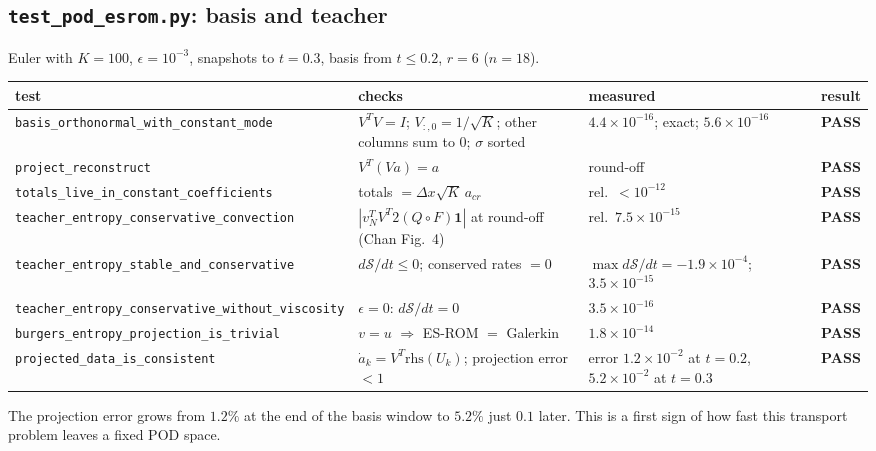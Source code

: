 \documentclass[11pt,a4paper]{article}
\newcommand{\code}[1]{\texttt{\small #1}}
\newcommand{\pass}{\textcolor{green!45!black}{\textbf{PASS}}}
\newcommand{\Sc}{\mathcal S}
\begin{document}
\subsection{\code{test\_pod\_esrom.py}: basis and teacher}
Euler with $K=100$, $\epsilon=10^{-3}$, snapshots to $t=0.3$, basis from $t\le0.2$, $r=6$ ($n=18$).
\begin{center}\small
\begin{tabular}{p{4.5cm}p{5.0cm}p{3.7cm}c}
\toprule
test & checks & measured & result\\\midrule
\code{basis\_orthonormal\_with\_constant\_mode} & $V^TV=I$; $V_{:,0}=1/\sqrt K$; other columns sum to 0; $\sigma$ sorted & $4.4\times10^{-16}$; exact; $5.6\times10^{-16}$ & \pass\\
\code{project\_reconstruct} & $V^T(Va)=a$ & round-off & \pass\\
\code{totals\_live\_in\_constant\_coefficients} & totals $=\Delta x\sqrt K\,a_{cr}$ & rel.\ $<10^{-12}$ & \pass\\
\code{teacher\_entropy\_conservative\_convection} & $|v_N^TV^T2(Q\circ F)\mathbf 1|$ at round-off (Chan Fig.~4) & rel.\ $7.5\times10^{-15}$ & \pass\\
\code{teacher\_entropy\_stable\_and\_conservative} & $d\Sc/dt\le0$; conserved rates $=0$ & $\max d\Sc/dt=-1.9\times10^{-4}$; $3.5\times10^{-15}$ & \pass\\
\code{teacher\_entropy\_conservative\_without\_viscosity} & $\epsilon=0$: $d\Sc/dt=0$ & $3.5\times10^{-16}$ & \pass\\
\code{burgers\_entropy\_projection\_is\_trivial} & $v=u$ $\Rightarrow$ ES-ROM $=$ Galerkin & $1.8\times10^{-14}$ & \pass\\
\code{projected\_data\_is\_consistent} & $\dot a_k=V^T\mathrm{rhs}(U_k)$; projection error $<1$ & error $1.2\times10^{-2}$ at $t=0.2$, $5.2\times10^{-2}$ at $t=0.3$ & \pass\\
\bottomrule
\end{tabular}
\end{center}
The projection error grows from $1.2\%$ at the end of the basis window to $5.2\%$ just $0.1$ later. This is a first sign of how fast this transport problem leaves a fixed POD space.
\end{document}
